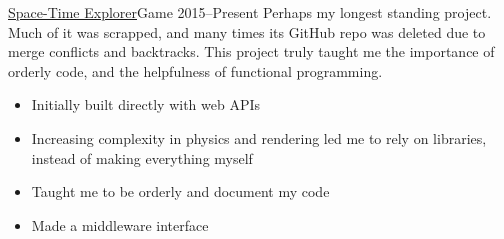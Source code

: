 \documentclass[10pt,a4paper,ragged2e,withhyper]{altacv}
\begin{document}
\begin{paracol}{2}
	\divider
	
	\cvevent
	{\href{https://github.com/jaacko-torus/STE/}{\uline{Space-Time Explorer}}{\hr}Game}
	{}
	{2015--Present}{}
	Perhaps my longest standing project. Much of it was scrapped, and many times its GitHub repo was deleted due to merge conflicts and backtracks. This project truly taught me the importance of orderly code, and the helpfulness of functional programming.
	\smallskip
	\begin{itemize}
		\item Initially built directly with web APIs
		\item Increasing complexity in physics and rendering led me to rely on libraries, instead of making everything myself
		\item Taught me to be orderly and document my code
		\item Made a middleware interface
	\end{itemize}
\end{paracol}
\end{document}
